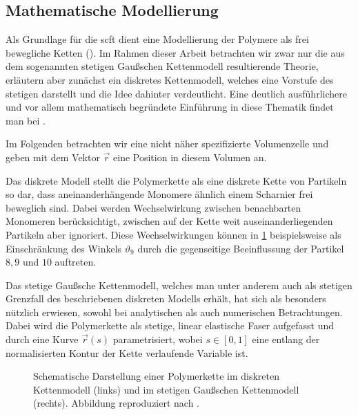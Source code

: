 \subsection*{Mathematische Modellierung} %

Als Grundlage für die \acl{scft} dient eine Modellierung der Polymere als frei bewegliche Ketten ().
Im Rahmen dieser Arbeit betrachten wir zwar nur die aus dem sogenannten stetigen Gaußschen Kettenmodell resultierende Theorie, erläutern aber zunächst ein diskretes Kettenmodell, welches eine Vorstufe des stetigen darstellt und die Idee dahinter verdeutlicht.
Eine deutlich ausführlichere und vor allem mathematisch begründete Einführung in diese Thematik findet man bei \textcites[Chapter 2]{Fredrickson:2006th}{rubinstein2003polymer}.

Im Folgenden betrachten wir eine nicht näher spezifizierte Volumenzelle und geben mit dem Vektor $\vec{r}$ eine Position in diesem Volumen an.

Das diskrete Modell stellt die Polymerkette als eine diskrete Kette von Partikeln so dar, dass aneinanderhängende Monomere ähnlich einem Scharnier frei beweglich sind.
Dabei werden Wechselwirkung zwischen benachbarten Monomeren berücksichtigt, zwischen auf der Kette weit auseinanderliegenden Partikeln aber ignoriert.
Diese Wechselwirkungen können in \cref{figure:kettenmodelle} beispielsweise als Einschränkung des Winkels $\vartheta_9$ durch die gegenseitige Beeinflussung der Partikel $8, 9$ und $10$ auftreten.

Das stetige Gaußsche Kettenmodell, welches man unter anderem auch als stetigen Grenzfall des beschriebenen diskreten Modells erhält, hat sich als besonders nützlich erwiesen, sowohl bei analytischen als auch numerischen Betrachtungen.
Dabei wird die Polymerkette als stetige, linear elastische Faser aufgefasst und durch eine Kurve $\vec{r}(s)$ parametrisiert, wobei $s \in [0, 1]$ eine entlang der normalisierten Kontur der Kette verlaufende Variable ist.

\begin{figure}[tb]
    \centering
        
    \caption[%
        Polymerkette in diskretem und Gaußschen Kettenmodell
    ]{%
        Schematische Darstellung einer Polymerkette im diskreten Kettenmodell (links) und im stetigen Gaußschen Kettenmodell (rechts).
        Abbildung reproduziert nach \cite[Figure 2.1 und 2.5]{Fredrickson:2006th}.
    }
    \label{figure:kettenmodelle}
\end{figure}

